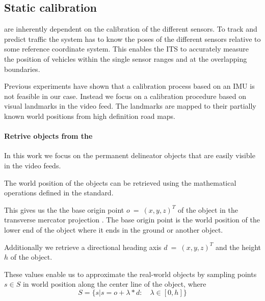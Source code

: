 
\subsection{Static calibration}

\ITS{} are inherently dependent on the calibration of the different sensors. 
To track and predict traffic the system has to know the poses of the different sensors relative to some reference coordinate system.
This enables the ITS to accurately measure the position of vehicles within the single sensor ranges and at the overlapping boundaries.

Previous experiments have shown that a calibration process based on an IMU is not feasible in our case. 
Instead we focus on a calibration procedure based on visual landmarks in the video feed.
The landmarks are mapped to their partially known world positions from high definition road maps. 


\paragraph{Retrive objects from the \HDmaps}
In this work we focus on the permanent delineator objects that are easily visible in the video feeds.

The world position of the objects can be retrieved using the mathematical operations defined in the \OD{} standard.

This gives us the the base origin point $o~=~(x, y, z)^T$ of the object in the transverse mercator projection \cite{proj}. 
The base origin point is the world position of the lower end of the object where it ends in the ground or another object.

Additionally we retrieve a directional heading axis $d~=~(x, y, z)^T$ and the height $h$ of the object.

These values enable us to approximate the real-world objects by sampling points $s \in S$ in world position along the center line of the object, where 
\begin{equation}
S = \{s | s = o + \lambda * d: \quad \lambda \in [0, h]\}
\end{equation}

